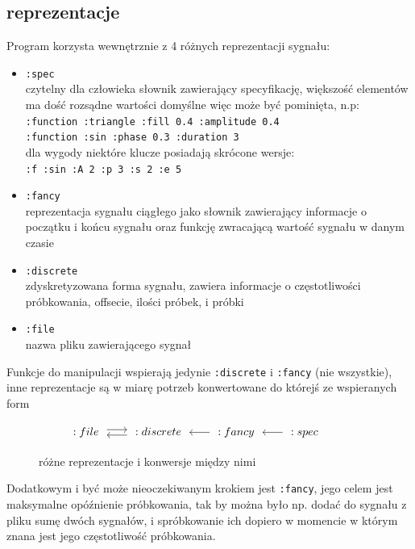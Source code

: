 \documentclass[12pt]{article}
\newcommand{\cljt}[1]{\texttt{#1}}
\begin{document}
\subsection{reprezentacje}
Program korzysta wewnętrznie z 4 różnych reprezentacji sygnału:
\begin{itemize}
	\item		\cljt{:spec} \\
	      czytelny dla człowieka słownik zawierający specyfikację, większość elementów ma dość rozsądne wartości domyślne więc może być pominięta, n.p:\\
	      \cljt{{:function :triangle :fill 0.4 :amplitude 0.4}} \\
	      \cljt{{:function :sin :phase 0.3 :duration 3}} \\
	      dla wygody niektóre klucze posiadają skrócone wersje: \\
	      \cljt{{:f :sin :A 2 :p 3 :s 2 :e 5}}

	\item		\cljt{:fancy} \\
	      reprezentacja sygnału ciągłego jako słownik zawierający informacje o początku i końcu sygnału oraz funkcję zwracającą wartość sygnału w danym czasie
	\item		\cljt{:discrete} \\
	      zdyskretyzowana forma sygnału, zawiera informacje o częstotliwości próbkowania, offsecie, ilości próbek, i próbki
	\item		\cljt{:file} \\
	      nazwa pliku zawierającego sygnał
\end{itemize}
Funkcje do manipulacji wspierają jedynie \cljt{:discrete} i \cljt{:fancy} (nie wszystkie), inne reprezentacje są w miarę potrzeb konwertowane do którejś ze wspieranych form
\begin{figure}
	\[\begin{tikzcd}[%
				cells={},
				every arrow/.append style={shorten <= 1mm, shorten >= 1mm}] %
			:file \arrow[shift left]{r} &
			:discrete \arrow[shift left]{l} &
			:fancy \arrow{l} &
			:spec \arrow{l} &
		\end{tikzcd}\]
	\caption{różne reprezentacje i konwersje między nimi}
\end{figure}

Dodatkowym i być może nieoczekiwanym krokiem jest \cljt{:fancy}, jego celem jest maksymalne opóźnienie próbkowania, tak by można było np. dodać do sygnału z pliku sumę dwóch sygnałów, i spróbkowanie ich dopiero w momencie w którym znana jest jego częstotliwość próbkowania.
\end{document}
